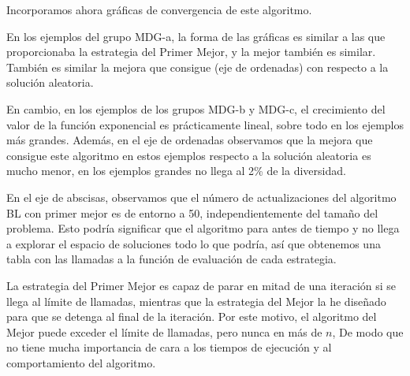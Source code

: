 \documentclass{article}
\begin{document}
Incorporamos ahora gráficas de convergencia de este algoritmo.


En los ejemplos del grupo MDG-a, la forma de las gráficas es similar a las que proporcionaba la estrategia del Primer Mejor, y 
la mejor también es similar. También es similar la mejora que consigue (eje de ordenadas) con respecto a la solución aleatoria.

En cambio, en los ejemplos de los grupos MDG-b y MDG-c, el crecimiento del valor de la función exponencial es prácticamente lineal,
sobre todo en los ejemplos más grandes. Además, en el eje de ordenadas observamos que la mejora que consigue este algoritmo en 
estos ejemplos respecto a la solución aleatoria es mucho menor, en los ejemplos grandes no llega al 2\% de la diversidad.

En el eje de abscisas, observamos que el número de actualizaciones del algoritmo BL con primer mejor es de entorno a 50,
independientemente del tamaño del problema. Esto podría significar que el algoritmo para antes de tiempo y no llega a explorar
el espacio de soluciones todo lo que podría, así que obtenemos una tabla con las llamadas a la función de evaluación de cada
estrategia.

La estrategia del Primer Mejor es capaz de parar en mitad de una iteración si se llega al límite de llamadas, mientras que la 
estrategia del Mejor la he diseñado para que se detenga al final de la iteración. Por este motivo, el algoritmo del Mejor puede
exceder el límite de llamadas, pero nunca en más de $n$, De modo que no tiene mucha importancia de cara a los tiempos de ejecución
y al comportamiento del algoritmo.
\end{document}
